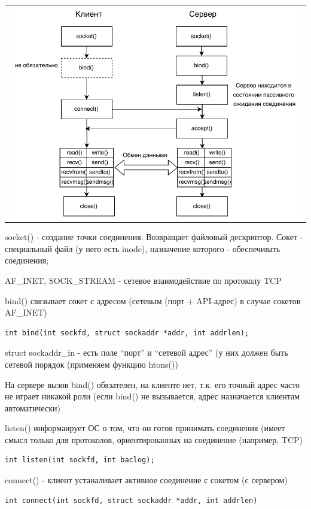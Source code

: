 \begin{table}[H]
  \centering
  \begin{tabular}{p{1\linewidth}}
    \centering
    \includegraphics[width=0.8\linewidth]{./images/4.pdf}
  \end{tabular}
\end{table}

socket() - создание точки соединения. Возвращает файловый дескриптор. Сокет - специальный файл (у него есть inode), назначение которого - обеспечивать соединения;

AF\_INET, SOCK\_STREAM - сетевое взаимодействие по протоколу TCP

bind() связывает сокет с адресом (сетевым (порт + API-адрес) в случае сокетов AF\_INET)

\begin{lstlisting}
int bind(int sockfd, struct sockaddr *addr, int addrlen);
\end{lstlisting}

struct sockaddr\_in - есть поле “порт” и “сетевой адрес” (у них должен быть сетевой порядок (применяем функцию htons())

На сервере вызов bind() обязателен, на клиенте нет, т.к. его точный адрес часто не играет никакой роли (если bind() не вызывается, адрес назначается клиентам автоматически)

listen() информаирует ОС о том, что он готов принимать соединения (имеет смысл только для протоколов, ориентированных на соединение (например, TCP)

\begin{lstlisting}
int listen(int sockfd, int baclog);
\end{lstlisting}
connect() - клиент устаналивает активное соединение с сокетом (с сервером)
\begin{lstlisting}
int connect(int sockfd, struct sockaddr *addr, int addrlen)
\end{lstlisting}

